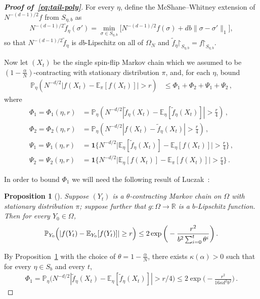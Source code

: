 \documentclass[reqno,11pt]{amsart}
\numberwithin{equation}{section}
\renewcommand{\restriction}{\mathord{\upharpoonright}}
\newcommand{\one}{\mathbf{1}}
\newtheorem{proposition}[theorem]{Proposition}
\theoremstyle{definition}{
\newtheorem{example}[theorem]{Example}
\newtheorem{definition}[theorem]{Definition}
\newtheorem*{definition*}{Definition}
\newtheorem{problem}[theorem]{Problem}
\newtheorem{question}[theorem]{Question}
\newtheorem{remark}[theorem]{Remark}
}
\newcommand{\E}{\mathbb E}
\begin{document}
\begin{proof}[\textbf{\emph{Proof of~\eqref{eq:tail-poly}}}]
For every $\eta$, define the McShane--Whitney extension of $N^{-(d-1)/2} f$ from $S_{\eta,b}$ as
\[N^{-(d-1)/2} \tilde f_\eta(\sigma')=  \min_{\sigma \in S_{\eta,b}} \bigg[ N^{-(d-1)/2} f(\sigma)+{db} \|\sigma-\sigma'\|_1\bigg ],
\]
so that $N^{-(d-1)/2} \tilde f_\eta$ is ${db}$-Lipschitz on all of $\Omega_N$ and $\tilde f_{\eta}\restriction_{S_{\eta,b}} = f\restriction_{S_{\eta,b}}$. 

Now let $(X_t)$ be the single spin-flip Markov chain which we assumed to be $(1-\frac{\alpha}N)$-contracting with stationary distribution $\pi$, and, for each $\eta$, bound 
\begin{align}\label{eq:Phi-Psi}
\mathbb P_{\eta} (N^{-d/2}|f(X_t)-\E_\pi [f(X_t)]|>r) &\leq \Phi_1 + \Phi_2 + \Psi_1 + \Psi_2\,,
\end{align}
where 
\begin{align*}
\Phi_1 =\Phi_1(\eta,r)&=  \mathbb P_{\eta} (N^{-d/2}|\tilde f_\eta (X_t) - \mathbb E_{\eta} [\tilde f_\eta(X_t)] | >\tfrac r4)\,,\\
\Phi_2 =\Phi_2(\eta,r)&=\mathbb P_{\eta}(N^{-d/2}|f(X_t)-\tilde f_\eta (X_t)|>\tfrac r4) \,,\\
\Psi_1 =\Psi_1(\eta,r)&= \one\bigl\{N^{-d/2}\big|\mathbb E_{\eta}[\tilde f_\eta(X_t)]-\mathbb E_{\eta}[ f(X_t)]\big| > \tfrac r4\bigr\}\,,\\
\Psi_2 =\Psi_2(\eta,r)&= \one\bigl\{N^{-d/2}\big|\mathbb E_{\eta}[f(X_t)]-\E_{\pi}[f(X_t)]\big| > \tfrac r4\bigr\}\,.
\end{align*}

In order to bound $\Phi_1$ we will need the following result of Luczak~\cite{Luczak08}:

\begin{proposition}[{\cite[Eq.~(4.14)]{Luczak08}}]\label{prop:luczak-2}Suppose $(Y_t)$ is a $\theta$-contracting Markov chain on $\Omega$ with stationary distribution $\pi$; suppose further that $g:\Omega\to\mathbb R$ is a $b$-Lipschitz function. Then for every $Y_0\in \Omega$,
\[\mathbb P_{Y_0} \Bigl(|f(Y_t)-\mathbb E_{Y_0}[f(Y_t)]|\geq r\Bigr)\leq 2\exp\bigg(-\frac{r^2}{b^2\sum _{i=0}^t \theta^i}\bigg)\,.
\]
\end{proposition}

By Proposition~\ref{prop:luczak-2} with the choice of $\theta= 1-\frac {\alpha}N$, there exists $\kappa(\alpha)>0$ such that for every $\eta\in S_b$ and every $t$,
\begin{align}\label{eq:phi-2}
\Phi_1 = \mathbb P_{\eta} \big(N^{-d/2} |\tilde f_\eta(X_t)-\mathbb E_{\eta} [\tilde f_\eta(X_t)] | > r/4 \big) \leq 2\exp\bigg(-\frac{r^2}{16 \kappa d^2 b^2}\bigg)\,.
\end{align} 


\end{proof}
\end{document}
